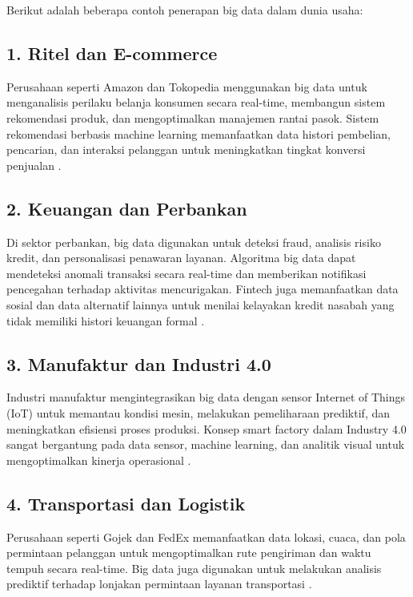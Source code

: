 Berikut adalah beberapa contoh penerapan big data dalam dunia usaha:

\subsection*{1. Ritel dan E-commerce}

Perusahaan seperti Amazon dan Tokopedia menggunakan big data untuk menganalisis perilaku belanja konsumen secara real-time, membangun sistem rekomendasi produk, dan mengoptimalkan manajemen rantai pasok. Sistem rekomendasi berbasis machine learning memanfaatkan data histori pembelian, pencarian, dan interaksi pelanggan untuk meningkatkan tingkat konversi penjualan \cite{mcafee2012, sun2019}.

\subsection*{2. Keuangan dan Perbankan}

Di sektor perbankan, big data digunakan untuk deteksi fraud, analisis risiko kredit, dan personalisasi penawaran layanan. Algoritma big data dapat mendeteksi anomali transaksi secara real-time dan memberikan notifikasi pencegahan terhadap aktivitas mencurigakan. Fintech juga memanfaatkan data sosial dan data alternatif lainnya untuk menilai kelayakan kredit nasabah yang tidak memiliki histori keuangan formal \cite{lee2019, goyal2022}.

\subsection*{3. Manufaktur dan Industri 4.0}

Industri manufaktur mengintegrasikan big data dengan sensor Internet of Things (IoT) untuk memantau kondisi mesin, melakukan pemeliharaan prediktif, dan meningkatkan efisiensi proses produksi. Konsep smart factory dalam Industry 4.0 sangat bergantung pada data sensor, machine learning, dan analitik visual untuk mengoptimalkan kinerja operasional \cite{lee2015, ghobakhloo2018}.

\subsection*{4. Transportasi dan Logistik}

Perusahaan seperti Gojek dan FedEx memanfaatkan data lokasi, cuaca, dan pola permintaan pelanggan untuk mengoptimalkan rute pengiriman dan waktu tempuh secara real-time. Big data juga digunakan untuk melakukan analisis prediktif terhadap lonjakan permintaan layanan transportasi \cite{zheng2016}.

